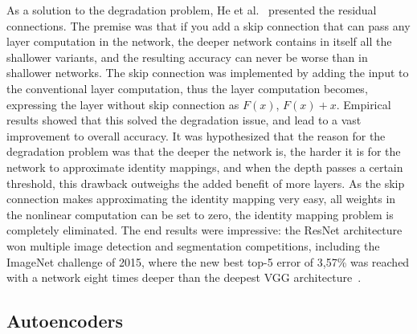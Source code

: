 \documentclass[english,twoside,openright]{UH_DS_MSc}
\begin{document}
As a solution to the degradation problem, He et al.~\cite{resnet} presented the residual connections.
The premise was that if you add a skip connection that can pass any layer computation in the network, 
the deeper network contains in itself all the shallower variants, and the resulting accuracy can never 
be worse than in shallower networks. The skip connection was implemented by adding the input to the conventional 
layer computation, thus the layer computation becomes, expressing the layer without skip connection as $F(x)$, 
$F(x) + x$.
Empirical results showed that this solved the degradation issue, and lead to a 
vast improvement to overall accuracy. It was hypothesized that the reason for the degradation problem 
was that the deeper the network is, the harder it is for the network to approximate identity mappings, and when 
the depth passes a certain threshold, this drawback outweighs the added benefit of more layers. As the skip 
connection makes approximating the identity mapping very easy, all weights in the nonlinear computation can 
be set to zero, the identity mapping problem is completely eliminated. The end results were impressive: 
the ResNet architecture won multiple image detection and segmentation competitions, including the ImageNet challenge 
of 2015, where the new best top-5 error of 3,57\% was reached with a network eight times deeper than the deepest VGG architecture~\cite{resnet}.

\subsection{Autoencoders}
\end{document}
